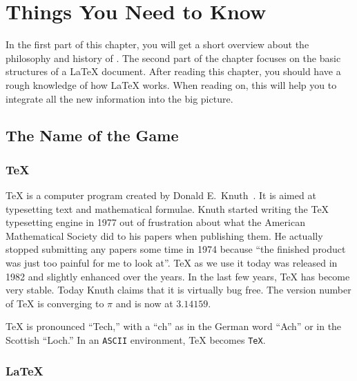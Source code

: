 ﻿%
 
\chapter{Things You Need to Know}
\begin{intro}
In the first part of this chapter, you will get a short 
overview about the philosophy and history of \LaTeXe. The second part
of the chapter focuses on the basic structures of a \LaTeX{} document. 
After reading this chapter, you should have a rough knowledge
of how \LaTeX{} works. When reading on, this will help you to integrate
all the new information into the big picture.  
\end{intro}

\section{The Name of the Game}
\subsection{\TeX}
 
\TeX{} is a computer program created by Donald
E.~Knuth~\cite{texbook}.  It is aimed at typesetting text and
mathematical formulae. Knuth started writing the \TeX{} typesetting
engine in 1977 out of frustration about what the American Mathematical
Society did to his papers when publishing them. He actually stopped
submitting any papers some time in 1974 because ``the finished product
was just too painful for me to look at''. \TeX{} as we use it today
was released in 1982 and slightly enhanced over the years. In the last
few years, \TeX{} has become very stable. Today Knuth claims that it is
virtually bug free. The version number of \TeX{} is converging to $\pi$
and is now at $3.14159$.


\TeX{} is pronounced ``Tech,'' with a ``ch'' as in the German word
``Ach'' or in the Scottish ``Loch.'' In an \texttt{ASCII} environment, \TeX{}
becomes \texttt{TeX}.

\subsection{\LaTeX}
 
